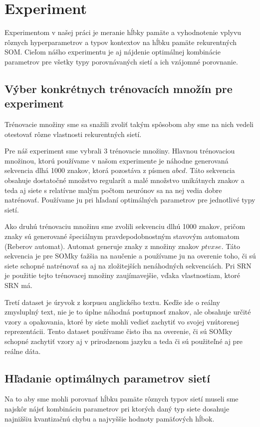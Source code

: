 \chapter{Experiment}

Experimentom v našej práci je meranie hĺbky pamäte a vyhodnotenie vplyvu rôznych
hyperparametrov a typov kontextov na hĺbku pamäte rekurentných SOM.
Cieľom nášho experimentu je aj nájdenie 
optimálnej kombinácie parametrov pre všetky typy porovnávaných sietí a ich vzájomné porovnanie.

\section{Výber konkrétnych trénovacích množín pre experiment}
Trénovacie množiny sme sa snažili zvoliť
takým spôsobom aby sme na nich vedeli otestovať rôzne vlastnosti rekurentných sietí.

Pre náš experiment sme vybrali 3 trénovacie množiny.
Hlavnou trénovaciou množinou, ktorú používame v našom experimente je náhodne generovaná 
sekvencia dlhá 1000 znakov, ktorá pozostáva z písmen $abcd$.
Táto sekvencia obsahuje dostatočné množstvo regularít a malé množstvo unikátnych znakov a teda
aj siete s relatívne malým počtom neurónov sa na nej vedia dobre natrénovať.
Používame ju pri hľadaní optimálných parametrov pre jednotlivé typy sietí.

Ako druhú trénovaciu množinu sme zvolili sekvenciu dlhú 1000 znakov, pričom znaky sú generované
špeciálnym pravdepodobnostným stavovým automatom (Reberov automat). Automat generuje znaky z množiny znakov $ptvxse$.
Táto sekvencia je pre SOMky ťažšia na naučenie a používame ju na overenie toho, či sú siete schopné natrénovať sa aj
na zložitejších nenáhodných sekvenciách. Pri SRN je použitie tejto trénovacej množiny zaujímavejšie,
vďaka vlastnostiam, ktoré SRN má.

Tretí dataset je úryvok z korpusu anglického textu.
Keďže ide o reálny zmysluplný text, nie je to úplne náhodná postupnosť znakov, ale obsahuje určité vzory a opakovania, ktoré by siete mohli vedieť zachytiť
vo svojej vnútorenej reprezentácii.
Tento dataset používame čisto iba na overenie, či 
sú SOMky schopné zachytiť vzory aj v prirodzenom jazyku a teda či sú použiteľné aj pre 
reálne dáta.

\section{Hľadanie optimálnych parametrov sietí}
Na to aby sme mohli porovnať hĺbku pamäte rôznych typov sietí museli sme najskôr
nájsť kombináciu parametrov pri ktorých daný typ siete dosahuje najnižšiu kvantizačnú chybu a 
najvyššie hodnoty pamäťových hĺbok. 

